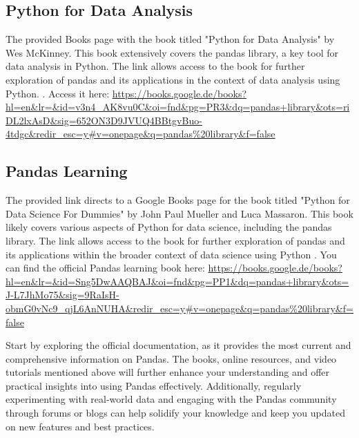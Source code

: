 \subsection{Python for Data Analysis}

The provided Books page with the book titled "Python for Data Analysis" by Wes McKinney. This book extensively covers the pandas library, a key tool for data analysis in Python. The link allows access to the book for further exploration of pandas and its applications in the context of data analysis using Python. \cite{McKinney:2012}. 
Access it here: \url{https://books.google.de/books?hl=en&lr=&id=v3n4_AK8vu0C&oi=fnd&pg=PR3&dq=pandas+library&ots=riDL2lxAsD&sig=652ON3D9JVUQ4BBtgvBuo-4tdgc&redir_esc=y#v=onepage&q=pandas%20library&f=false}

\subsection{Pandas Learning}
The provided link directs to a Google Books page for the book titled "Python for Data Science For Dummies" by John Paul Mueller and Luca Massaron. This book likely covers various aspects of Python for data science, including the pandas library. The link allows access to the book for further exploration of pandas and its applications within the broader context of data science using Python \cite{Heydt:2017}. 
You can find the official Pandas learning book here: \url{https://books.google.de/books?hl=en&lr=&id=Sng5DwAAQBAJ&oi=fnd&pg=PP1&dq=pandas+library&ots=J-L7JhMo75&sig=9RaIsH-obmG0vNc9_qjL6AnNUHA&redir_esc=y#v=onepage&q=pandas%20library&f=false}

Start by exploring the official documentation, as it provides the most current and comprehensive information on Pandas. The books, online resources, and video tutorials mentioned above will further enhance your understanding and offer practical insights into using Pandas effectively. Additionally, regularly experimenting with real-world data and engaging with the Pandas community through forums or blogs can help solidify your knowledge and keep you updated on new features and best practices.




